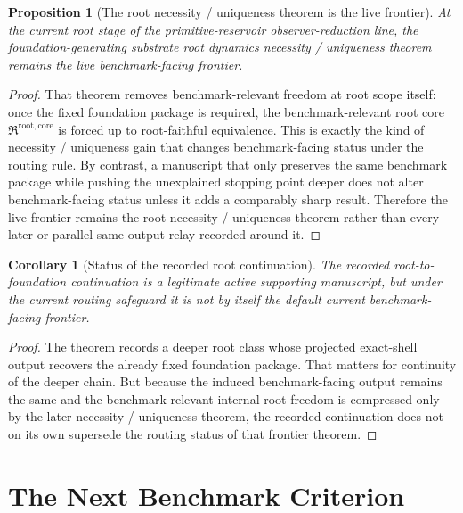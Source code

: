 \documentclass[11pt]{article}
\newcommand{\RootCore}{\mathfrak R^{\mathrm{root,core}}}
\newtheorem{proposition}{Proposition}
\newtheorem{corollary}{Corollary}
\begin{document}
\begin{proposition}[The root necessity / uniqueness theorem is the live frontier]
At the current root stage of the primitive-reservoir observer-reduction line, the foundation-generating substrate root dynamics necessity / uniqueness theorem remains the live benchmark-facing frontier.
\end{proposition}

\begin{proof}
That theorem removes benchmark-relevant freedom at root scope itself: once the fixed foundation package is required, the benchmark-relevant root core \(\RootCore\) is forced up to root-faithful equivalence. This is exactly the kind of necessity / uniqueness gain that changes benchmark-facing status under the routing rule. By contrast, a manuscript that only preserves the same benchmark package while pushing the unexplained stopping point deeper does not alter benchmark-facing status unless it adds a comparably sharp result. Therefore the live frontier remains the root necessity / uniqueness theorem rather than every later or parallel same-output relay recorded around it.
\end{proof}

\begin{corollary}[Status of the recorded root continuation]
The recorded root-to-foundation continuation is a legitimate active supporting manuscript, but under the current routing safeguard it is not by itself the default current benchmark-facing frontier.
\end{corollary}

\begin{proof}
The theorem records a deeper root class whose projected exact-shell output recovers the already fixed foundation package. That matters for continuity of the deeper chain. But because the induced benchmark-facing output remains the same and the benchmark-relevant internal root freedom is compressed only by the later necessity / uniqueness theorem, the recorded continuation does not on its own supersede the routing status of that frontier theorem.
\end{proof}

\section{The Next Benchmark Criterion}
\end{document}
